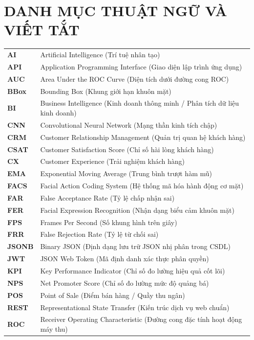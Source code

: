 \section*{DANH MỤC THUẬT NGỮ VÀ VIẾT TẮT}
 {}

\begin{tabular}{p{2.5cm} p{13cm}}
    \textbf{AI} & Artificial Intelligence (Trí tuệ nhân tạo) \\
    \textbf{API} & Application Programming Interface (Giao diện lập trình ứng dụng) \\
    \textbf{AUC} & Area Under the ROC Curve (Diện tích dưới đường cong ROC) \\
    \textbf{BBox} & Bounding Box (Khung giới hạn khuôn mặt) \\
    \textbf{BI} & Business Intelligence (Kinh doanh thông minh / Phân tích dữ liệu kinh doanh) \\
    \textbf{CNN} & Convolutional Neural Network (Mạng thần kinh tích chập) \\
    \textbf{CRM} & Customer Relationship Management (Quản trị quan hệ khách hàng) \\
    \textbf{CSAT} & Customer Satisfaction Score (Chỉ số hài lòng khách hàng) \\
    \textbf{CX} & Customer Experience (Trải nghiệm khách hàng) \\
    \textbf{EMA} & Exponential Moving Average (Trung bình trượt hàm mũ) \\
    \textbf{FACS} & Facial Action Coding System (Hệ thống mã hóa hành động cơ mặt) \\
    \textbf{FAR} & False Acceptance Rate (Tỷ lệ chấp nhận sai) \\
    \textbf{FER} & Facial Expression Recognition (Nhận dạng biểu cảm khuôn mặt) \\
    \textbf{FPS} & Frames Per Second (Số khung hình trên giây) \\
    \textbf{FRR} & False Rejection Rate (Tỷ lệ từ chối sai) \\
    \textbf{JSONB} & Binary JSON (Định dạng lưu trữ JSON nhị phân trong CSDL) \\
    \textbf{JWT} & JSON Web Token (Mã định danh xác thực phân quyền) \\
    \textbf{KPI} & Key Performance Indicator (Chỉ số đo lường hiệu quả cốt lõi) \\
    \textbf{NPS} & Net Promoter Score (Chỉ số đo lường mức độ quảng bá) \\
    \textbf{POS} & Point of Sale (Điểm bán hàng / Quầy thu ngân) \\
    \textbf{REST} & Representational State Transfer (Kiến trúc dịch vụ web chuẩn) \\
    \textbf{ROC} & Receiver Operating Characteristic (Đường cong đặc tính hoạt động máy thu) \\
\end{tabular}

\newpage